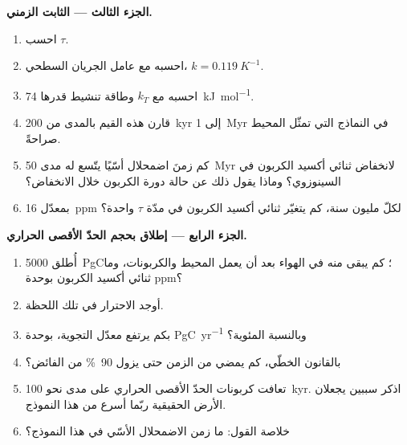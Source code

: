 \begin{problem}
\noindent\textbf{الجزء الثالث --- الثابت الزمني.}
\begin{enumerate}[resume]
  \item احسب $\tau$.
  \item احسبه مع عامل الجريان السطحي، $k = \qty{0.119}{K^{-1}}$.
  \item احسبه مع $k_T$ وطاقة تنشيط قدرها \qty{74}{kJ.mol^{-1}}.
  \item قارن هذه القيم بالمدى من \qty{200}{kyr} إلى \qty{1}{Myr} في النماذج التي تمثّل المحيط صراحةً.
  \item كم زمنَ اضمحلال أسّيًا يتّسع له مدى \qty{50}{Myr} لانخفاض ثنائي أكسيد الكربون في
        السينوزوي؟ وماذا يقول ذلك عن حالة دورة الكربون خلال الانخفاض؟
  \item بمعدّل \qty{16}{ppm} لكلّ مليون سنة، كم يتغيّر ثنائي أكسيد الكربون في مدّة $\tau$ واحدة؟
\end{enumerate}

\noindent\textbf{الجزء الرابع --- إطلاق بحجم الحدّ الأقصى الحراري.}
\begin{enumerate}[resume]
  \item أُطلق \qty{5000}{PgC}؛ كم يبقى منه في الهواء بعد أن يعمل المحيط والكربونات،
        وما ثنائي أكسيد الكربون بوحدة ppm؟
  \item أوجد الاحترار في تلك اللحظة.
  \item بكم يرتفع معدّل التجوية، بوحدة \unit{PgC.yr^{-1}} وبالنسبة المئوية؟
  \item بالقانون الخطّي، كم يمضي من الزمن حتى يزول \qty{90}{\percent} من الفائض؟
  \item تعافت كربونات الحدّ الأقصى الحراري على مدى نحو \qty{100}{kyr}. اذكر سببين يجعلان الأرض
        الحقيقية ربّما أسرع من هذا النموذج.
  \item خلاصة القول: ما زمن الاضمحلال الأسّي  في هذا النموذج؟
\end{enumerate}
\end{problem}
